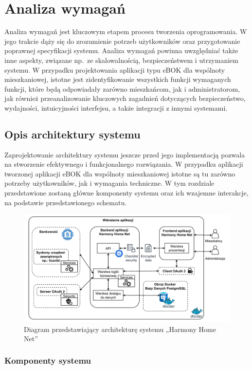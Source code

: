 \chapter{Analiza wymagań}
Analiza wymagań jest kluczowym etapem procesu tworzenia oprogramowania. W jego trakcie dąży się do zrozumienie potrzeb użytkowników oraz przygotowanie poprawnej specyfikacji systemu. Analiza wymagań powinna uwzględniać także inne aspekty, związane np.\ ze skalowalnością, bezpieczeństwem i utrzymaniem systemu. W przypadku projektowania aplikacji typu eBOK dla wspólnoty mieszkaniowej, istotne jest zidentyfikowanie wszystkich funkcji wymaganych funkcji, które będą odpowiadały zarówno mieszkańcom, jak i administratorom, jak również przeanalizowanie kluczowych zagadnień dotyczących bezpieczeństwo, wydajności, intuicyjności interfejsu, a także integracji z innymi systemami. 

\section{Opis architektury systemu}
Zaprojektowanie architektury systemu jeszcze przed jego implementacją pozwala na stworzenie efektywnego i funkcjonalnego rozwiązania. W przypadku aplikacji tworzonej aplikacji eBOK dla wspólnoty mieszkaniowej istotne są tu zarówno potrzeby użytkowników, jak i wymagania techniczne. W tym rozdziale przedstawione zostaną główne komponenty systemu oraz ich wzajemne interakcje, na podstawie przedstawionego schematu.

\begin{figure}[ht]
    \centering
    \includegraphics[width=.8\linewidth]{Schematy/zarys_architektury}
    \caption{Diagram przedstawiający architekturę systemu „Harmony Home Net”}
    \label{fig:zarys_architektury}
\end{figure}


\subsection{Komponenty systemu}

